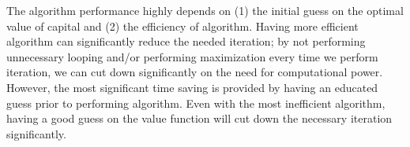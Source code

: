 \documentclass[letter,10.5pt]{article}
\begin{document}
The algorithm performance highly depends on (1) the initial guess on the optimal value of capital and (2) the efficiency of algorithm. Having more efficient algorithm can significantly reduce the needed iteration; by not performing unnecessary looping and/or performing maximization every time we perform iteration, we can cut down significantly on the need for computational power. However, the most significant time saving is provided by having an educated guess prior to performing algorithm. Even with the most inefficient algorithm, having a good guess on the value function will cut down the necessary iteration significantly.
\end{document}

